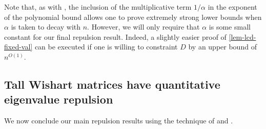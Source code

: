 \documentclass[11pt]{article}
\numberwithin{equation}{section}
\theoremstyle{remark}
\begin{document}
Note that, as with \cite{christoffersen2025gaps}, the inclusion of the multiplicative term $1/\alpha$ in the exponent of the polynomial bound allows one to prove extremely strong lower bounds when $\alpha$ is taken to decay with $n$. However, we will only require that $\alpha$ is some small constant for our final repulsion result. Indeed, a slightly easier proof of \cref{lem-lcd-fixed-val} can be executed if one is willing to constraint $D$ by an upper bound of $n^{O(1)}$.

\subsection{Tall Wishart matrices have quantitative eigenvalue repulsion}
We now conclude our main repulsion results using the technique of \cite{nguyen2015randommatricestailbounds} and \cite{christoffersen2025gaps}.
\end{document}
